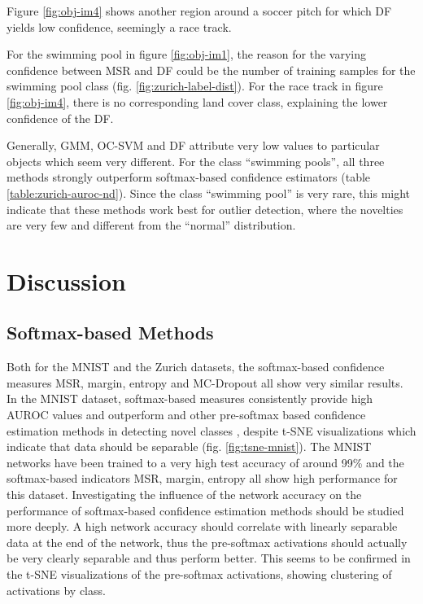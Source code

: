 \documentclass[10pt]{article}
\begin{document}
Figure \ref{fig:obj-im4} shows another region around a soccer pitch for which \gls{DF} yields low confidence, seemingly a race track.


For the swimming pool in figure \ref{fig:obj-im1}, the reason for the varying confidence between MSR and \acrlong{DF} could be the number of training samples for the swimming pool class (fig. \ref{fig:zurich-label-dist}). For the race track in figure \ref{fig:obj-im4}, there is no corresponding land cover class, explaining the lower confidence of the \acrlong{DF}. 

Generally, \gls{GMM}, \gls{OC-SVM} and \gls{DF} attribute very low values to particular objects which seem very different. For the class ``swimming pools'', all three methods strongly outperform softmax-based confidence estimators (table \ref{table:zurich-auroc-nd}). Since the class ``swimming pool'' is very rare, this might indicate that these methods work best for outlier detection, where the novelties are very few and different from the ``normal'' distribution.

\section{Discussion}
\label{sec:discussion}

\subsection{Softmax-based Methods}
Both for the \gls{MNIST} and the Zurich datasets, the softmax-based confidence measures \gls{MSR}, margin, entropy and \gls{MC-Dropout} all show very similar results. In the MNIST dataset, softmax-based measures consistently provide high AUROC values and outperform   and other pre-softmax based confidence estimation methods in detecting novel classes , despite \gls{t-SNE} visualizations which indicate that data should be separable (fig. \ref{fig:tsne-mnist}). The MNIST networks have been trained to a very high test accuracy of around 99\% and the softmax-based indicators \gls{MSR}, margin, entropy all show high performance for this dataset. Investigating the influence of the network accuracy on the performance of softmax-based confidence estimation methods should be studied more deeply. A high network accuracy should correlate with linearly separable data at the end of the network, thus the pre-softmax activations should actually be very clearly separable and thus perform better. This seems to be confirmed in the t-SNE visualizations of the pre-softmax activations, showing clustering of activations by class.
\end{document}
